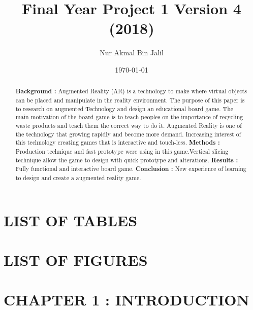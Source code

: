 \documentclass[12pt]{article}
\title{Final Year Project 1 Version 4 (2018)}
\author{Nur Akmal Bin Jalil }
\date{\today}
\begin{document}
\maketitle
\pagebreak

\begin{abstract}
\noindent\textbf{Background : }Augmented Reality (AR) is a technology to make where virtual objects can be placed and manipulate in the reality environment. The purpose of this paper is to research on augmented Technology and design an educational board game. The main motivation of the board game is to teach peoples on the importance of recycling waste products and teach them the correct way to do it. Augmented Reality is one of the technology that growing rapidly and become more demand. Increasing interest of this technology creating games that is interactive and touch-less.  
\newline \textbf{Methods : }Production technique and fast prototype were using in this game.Vertical slicing technique allow the game to design with quick prototype and alterations.
\newline \textbf{Results : }Fully functional and interactive board game. 
\newline \textbf{Conclusion : }New experience of learning to design and create a augmented reality game.
\end{abstract}
\pagebreak

\tableofcontents
\pagebreak


\section*{LIST OF TABLES}
\pagebreak

\section*{LIST OF FIGURES}
\pagebreak

\section{CHAPTER 1 : INTRODUCTION}
\end{document}
